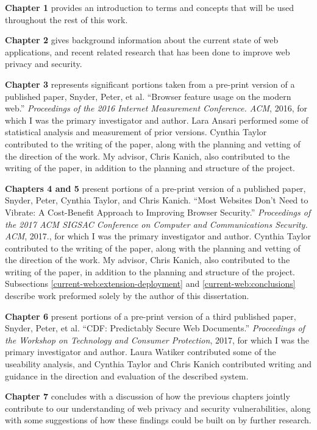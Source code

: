 \authorcontributions

\textbf{Chapter 1} provides an introduction to terms and concepts that will be
used throughout the rest of this work.

\textbf{Chapter 2} gives background information about the current state of web
applications, and recent related research that has been done to improve web
privacy and security.

\textbf{Chapter 3} represents significant portions taken from a pre-print
version of a published paper, Snyder, Peter, et al. ``Browser feature usage on
the modern web.'' \textit{Proceedings of the 2016 Internet Measurement
Conference. ACM}, 2016, for which I was the primary investigator and author.
Lara Ansari performed some of statistical analysis and measurement of prior \FF
versions.  Cynthia Taylor contributed to the writing of the paper, along with
the planning and vetting of the direction of the work.  My advisor, Chris
Kanich, also contributed to the writing of the paper, in addition to the
planning and structure of the project.

\textbf{Chapters 4 and 5} present portions of a pre-print version of a
published paper, Snyder, Peter, Cynthia Taylor, and Chris Kanich. ``Most
Websites Don't Need to Vibrate: A Cost-Benefit Approach to Improving Browser
Security.'' \textit{Proceedings of the 2017 ACM SIGSAC Conference on Computer
and Communications Security. ACM}, 2017., for which I was the primary
investigator and author.  Cynthia Taylor contributed to the writing of the
paper, along with the planning and vetting of the direction of the work.  My
advisor, Chris Kanich, also contributed to the writing of the paper, in
addition to the planning and structure of the project.  Subsections
\ref{current-web:extension-deployment} and \ref{current-web:conclusions}
describe work preformed solely by the author of this dissertation.

\textbf{Chapter 6} present portions of a pre-print version of a third published
paper, Snyder, Peter, et al. ``CDF: Predictably Secure Web Documents.''
\textit{Proceedings of the Workshop on Technology and Consumer Protection},
2017, for which I was the primary investigator and author.  Laura Watiker
contributed some of the useability analysis, and Cynthia Taylor and Chris
Kanich contributed writing and guidance in the direction and evaluation of the
described system.

\textbf{Chapter 7} concludes with a discussion of how the previous chapters
jointly contribute to our understanding of web privacy and security
vulnerabilities, along with some suggestions of how these findings could be
built on by further research.
